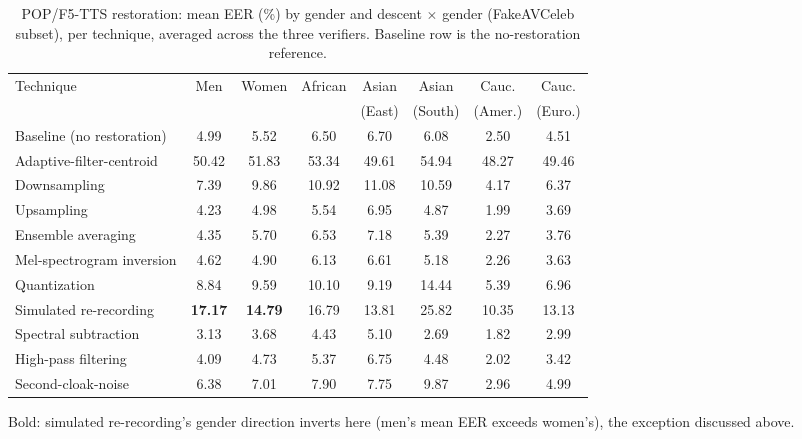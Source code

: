\documentclass[11pt]{article}
\begin{document}
\begin{table}[H]
\centering
\caption{POP/F5-TTS restoration: mean EER (\%) by gender and descent
$\times$ gender (FakeAVCeleb subset), per technique, averaged across
the three verifiers. Baseline row is the no-restoration reference.}
\label{tab:restoration-pop-f5tts-demo}
\begin{tabular}{lccccccc}
\toprule
Technique & Men & Women & African & Asian & Asian & Cauc. & Cauc. \\
 & & & & (East) & (South) & (Amer.) & (Euro.) \\
\midrule
Baseline (no restoration) & 4.99 & 5.52 & 6.50 & 6.70 & 6.08 & 2.50 & 4.51 \\
Adaptive-filter-centroid & 50.42 & 51.83 & 53.34 & 49.61 & 54.94 & 48.27 & 49.46 \\
Downsampling & 7.39 & 9.86 & 10.92 & 11.08 & 10.59 & 4.17 & 6.37 \\
Upsampling & 4.23 & 4.98 & 5.54 & 6.95 & 4.87 & 1.99 & 3.69 \\
Ensemble averaging & 4.35 & 5.70 & 6.53 & 7.18 & 5.39 & 2.27 & 3.76 \\
Mel-spectrogram inversion & 4.62 & 4.90 & 6.13 & 6.61 & 5.18 & 2.26 & 3.63 \\
Quantization & 8.84 & 9.59 & 10.10 & 9.19 & 14.44 & 5.39 & 6.96 \\
Simulated re-recording & \textbf{17.17} & \textbf{14.79} & 16.79 & 13.81 & 25.82 & 10.35 & 13.13 \\
Spectral subtraction & 3.13 & 3.68 & 4.43 & 5.10 & 2.69 & 1.82 & 2.99 \\
High-pass filtering & 4.09 & 4.73 & 5.37 & 6.75 & 4.48 & 2.02 & 3.42 \\
Second-cloak-noise & 6.38 & 7.01 & 7.90 & 7.75 & 9.87 & 2.96 & 4.99 \\
\bottomrule
\end{tabular}

{\small Bold: simulated re-recording's gender direction inverts here
(men's mean EER exceeds women's), the exception discussed above.}
\end{table}
\end{document}
